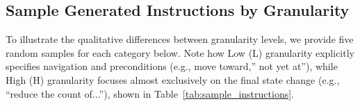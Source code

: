 


\subsection{Sample Generated Instructions by Granularity} \label{app_sec:sample_instructions}

To illustrate the qualitative differences between granularity levels, we provide five random samples for each category below. Note how Low (L) granularity explicitly specifies navigation and preconditions (e.g., move toward,'' not yet at''), while High (H) granularity focuses almost exclusively on the final state change (e.g., ``reduce the count of...''), shown in Table~\ref{tab:sample_instructions}.

